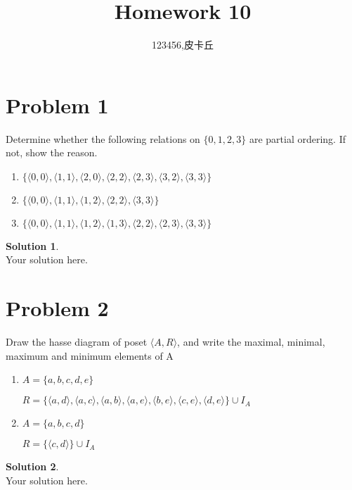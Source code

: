 \documentclass[a4paper,UTF8]{article}
\theoremstyle{definition}
\newtheorem*{solution}{Solution}
\begin{document}
\title{Homework 10}
\author{123456,皮卡丘}
\maketitle








\section*{Problem 1}
Determine whether the following relations on $\{0,1,2,3\}$ are partial ordering. If not, show the reason.
\begin{enumerate}
	\item $\{\langle 0,0\rangle ,\langle 1,1\rangle ,\langle 2,0\rangle ,\langle 2,2\rangle, \langle 2,3\rangle,\langle 3,2\rangle, \langle 3,3\rangle \}$
	\item $\{\langle 0,0\rangle ,\langle 1,1\rangle ,\langle 1,2\rangle, \langle 2,2\rangle ,\langle 3,3\rangle \}$	
	\item $\{\langle 0,0\rangle ,\langle 1,1\rangle ,\langle 1,2\rangle ,\langle 1,3\rangle, \langle 2,2\rangle,\langle 2,3\rangle ,\langle 3,3\rangle \}$
\end{enumerate}
\begin{solution}
	~\\
	Your solution here.
\end{solution}



\section*{Problem 2}
Draw the hasse diagram of poset $\langle A,R \rangle$, and write the maximal, minimal, maximum and minimum elements of A
\begin{enumerate}
	\item $A=\{a,b,c,d,e\}$
	
	$R=\{\langle a,d\rangle,\langle a,c\rangle,\langle a,b\rangle, \langle a,e\rangle,\langle b,e\rangle,\langle c,e\rangle,\langle d,e\rangle\} \cup I_A$
	
	\item $A=\{a,b,c,d\}$
	
	$R=\{\langle c,d\rangle\}\cup I_A$
\end{enumerate}
\begin{solution}
	~\\
	Your solution here.
\end{solution}
\end{document}

